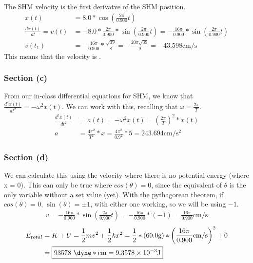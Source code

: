 \documentclass[12pt]{article}
\begin{document}
The SHM velocity is the first derivatve of the SHM position.
\begin{align}
    x(t)    &=  8.0 * \cos\left( \frac{2\pi}{0.900}t \right)\\
    \frac{dx(t)}{dt}    =
    v(t)    &=  -8.0 * \frac{2\pi}{0.900} * \sin\left( \frac{2\pi}{0.900}t \right)
        =   -\frac{16\pi}{0.900} * \sin\left( \frac{2\pi}{0.900}t \right)\\
    v(t_1)  &=  -\frac{16\pi}{0.900}*\frac{\sqrt{39}}{8}
        =   -\frac{20\pi\sqrt{39}}{9}
        =   -43.598\unit{\centi\meter/\second}
\end{align}
This means that the velocity is \boxed{43.598\unit{\meter/\second}}.

\subsubsection{Section (c)}
From our in-class differential equations for SHM, we know that \(\frac{d^2 x(t)}{dt^2} = -\omega^2 x(t)\). We can work with this, recalling that $\omega = \frac{2\pi}{T}$.
\begin{align*}
    \frac{d^2 x(t)}{dt^2}   &=  a(t)
        =   -\omega^2 x(t)
        =   \left(\frac{2\pi}{T}\right)^2 * x(t)\\
    a   &=  \frac{4\pi^2}{T^2} * x
        =   \frac{4\pi^2}{0.9^2} * 5
        =   \boxed{243.694\unit{\centi\meter/\second^2}}
\end{align*}

\subsubsection{Section (d)}
We can calculate this using the velocity where there is no potential energy (where x = 0). This can only be true where $cos(\theta) = 0$, since the equivalent of $\theta$ is the only variable without a set value (yet). With the pythagorean theorem, if $cos(\theta) = 0$, $\sin(\theta) = \pm 1$, with either one working, so we will be using $-1$.
\begin{gather}
    v   =   -\frac{16\pi}{0.900} * \sin\left( \frac{2\pi}{0.900}t \right)
        =   -\frac{16\pi}{0.900} * (-1)
        =   \frac{16\pi}{0.900}\unit{\centi\meter/\second}
\end{gather}\begin{align}
    E_{total}   &=  K + U
        =   \frac{1}{2}mv^2 + \frac{1}{2}kx^2
        =   \frac{1}{2}*(60.0\unit{\gram})*\left(\frac{16\pi}{0.900}\unit{\centi\meter/\second}\right)^2 + 0\\
        &=  \boxed{93578\ \unit{\dyne*\centi\meter} = 9.3578\times10^{-3}\unit{\joule}}
\end{align}
\end{document}
